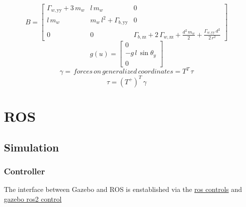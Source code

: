 \documentclass[a4paper, 7px]{article}
\begin{document}
$$B = 
\begin{bmatrix}
	\Gamma _{w,\mathrm{yy}}+3\,m_{w} & l\,m_{w} & 0\\
	l\,m_{w} & m_{w}\,l^2+\Gamma _{b,\mathrm{yy}} & 0\\
	0 & 0 & \Gamma _{b,\mathrm{zz}}+2\,\Gamma _{w,\mathrm{zz}}+\frac{d^2\,m_{w}}{2}+\frac{\Gamma _{w,\mathrm{yy}}\,d^2}{2\,r^2} \end{bmatrix}
$$
$$g(u) = 
\begin{bmatrix}
	0\\
	-g \, l \, \sin{\theta_y}\\
	0
\end{bmatrix}
$$
$$\gamma = \, forces \, on \, generalized \, coordinates = T^T \,  \tau$$
$$\tau = (T^+)^T \, \gamma$$


\section{ROS}

\subsection{Simulation}

\subsubsection{Controller}
The interface between Gazebo and ROS is enstablished via the \href{https://github.com/ros-controls/ros2_control}{ros controls} 
and \href{https://github.com/ros-controls/gazebo_ros2_control}{gazebo ros2 control}
\end{document}

